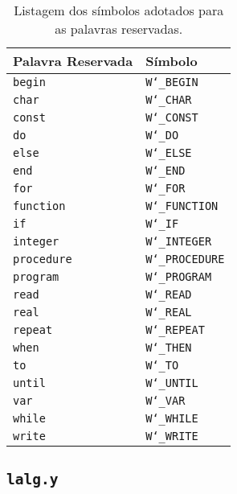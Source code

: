 \begin{table}[h]
\begin{center}
	\begin{tabular}{|l|l|} 
		\hline
		\textbf{Palavra Reservada} & \textbf{Símbolo}\\
		\hline
		\texttt{begin}     &  \texttt{W\char`_BEGIN}\\
		\texttt{char}      &  \texttt{W\char`_CHAR}\\
		\texttt{const}     &  \texttt{W\char`_CONST}\\
		\texttt{do}        &  \texttt{W\char`_DO}\\
		\texttt{else}      &  \texttt{W\char`_ELSE}\\
		\texttt{end}       &  \texttt{W\char`_END}\\
		\texttt{for}       &  \texttt{W\char`_FOR}\\
		\texttt{function } &  \texttt{W\char`_FUNCTION}\\
		\texttt{if}        &  \texttt{W\char`_IF}\\
		\texttt{integer}   &  \texttt{W\char`_INTEGER}\\
		\texttt{procedure} &  \texttt{W\char`_PROCEDURE}\\
		\texttt{program}   &  \texttt{W\char`_PROGRAM}\\
		\texttt{read}      &  \texttt{W\char`_READ}\\
		\texttt{real}      &  \texttt{W\char`_REAL}\\
		\texttt{repeat}    &  \texttt{W\char`_REPEAT}\\
		\texttt{when}      &  \texttt{W\char`_THEN}\\
		\texttt{to}        &  \texttt{W\char`_TO}\\
		\texttt{until}     &  \texttt{W\char`_UNTIL}\\
		\texttt{var}       &  \texttt{W\char`_VAR}\\
		\texttt{while}     &  \texttt{W\char`_WHILE}\\
		\texttt{write}     &  \texttt{W\char`_WRITE}\\
		\hline
	\end{tabular}
	\caption{Listagem dos símbolos adotados para as palavras reservadas. \label{tab:sim_reservada}}
\end{center}
\end{table}

\subsection{\texttt{lalg.y}}

